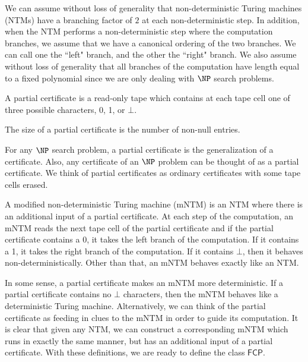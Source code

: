 \documentclass[runningheads,a4paper]{llncs}
\begin{document}
We can assume without loss of generality that non-deterministic Turing machines (NTMs) have a branching factor of $2$ at each non-deterministic step. In addition, when the NTM performs a non-deterministic step where the computation branches, we assume that we have a canonical ordering of the two branches. We can call one the ``left" branch, and the other the ``right" branch. We also assume without loss of generality that all branches of the computation have length equal to a fixed polynomial since we are only dealing with $\NP$ search problems.

\begin{definition}
A partial certificate is a read-only tape which contains at each tape cell one of three possible characters, 0, 1, or $\bot$.
\end{definition}

\begin{definition}
The size of a partial certificate is the number of non-null entries. 
\end{definition}

For any $\NP$ search problem, a partial certificate is the generalization of a certificate. Also, any certificate of an $\NP$ problem can be thought of as a partial certificate. We think of partial certificates as ordinary certificates with some tape cells erased.

\begin{definition}
A modified non-deterministic Turing machine (mNTM) is an NTM where there is an additional input of a partial certificate. At each step of the computation, an mNTM reads the next tape cell of the partial certificate and if the partial certificate contains a 0, it takes the left branch of the computation. If it contains a 1, it takes the right branch of the computation. If it contains $\bot$, then it behaves non-deterministically. Other than that, an mNTM behaves exactly like an NTM.
\end{definition}

In some sense, a partial certificate makes an mNTM more deterministic. If a partial certificate contains no $\bot$ characters, then the mNTM behaves like a deterministic Turing machine. Alternatively, we can think of the partial certificate as feeding in clues to the mNTM in order to guide its computation. It is clear that given any NTM, we can construct a corresponding mNTM which runs in exactly the same manner, but has an additional input of a partial certificate. With these definitions, we are ready to define the class $\mathsf{FCP}$.
\end{document}
